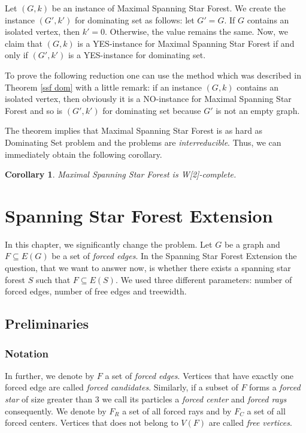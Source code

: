 \documentclass[en]{pracamgr}
\newtheorem{corollary}{Corollary}
\newenvironment{sproof}{%
	\renewcommand{\proofname}{Proof (sketch).}\proof}{\endproof}
\newcommand{\ssf}{spanning star forest}
\newcommand{\mssfp}{{\sc Maximal Spanning Star Forest}}
\newcommand{\ssfep}{{\sc Spanning Star Forest Extension}}
\newcommand{\domset}{dominating set}
\newcommand{\domsetp}{{\sc Dominating Set} problem}
\begin{document}
\begin{sproof}
	Let $(G,k)$ be an instance of \mssfp{}. We create the instance $(G',k')$ for \domset{} as follows: let $G'=G$. If $G$ contains an isolated vertex, then $k'=0$. Otherwise, the value remains the same. Now, we claim that $(G,k)$ is a YES-instance for \mssfp{} if and only if $(G',k')$ is a YES-instance for \domset.
	
	To prove the following reduction one can use the method which was described in Theorem \ref{ssf dom} with a little remark: if an instance $(G,k)$ contains an isolated vertex, then obviously it is a NO-instance for \mssfp{} and so is $(G',k')$ for \domset{} because $G'$ is not an empty graph.
\end{sproof}

The theorem implies that \mssfp{} is as hard as \domsetp{} and the problems are \emph{interreducible}. Thus, we can immediately obtain the following corollary.

\begin{corollary}
	\mssfp{} is {\normalfont W[2]-complete}.
\end{corollary}

\chapter{Spanning Star Forest Extension}

In this chapter, we significantly change the problem. Let $G$ be a graph and $F \subseteq E(G)$ be a set of \emph{forced edges}. In the \ssfep{} the question, that we want to answer now, is whether there exists a \ssf{} $S$ such that $F \subseteq E(S)$. We used three different parameters: number of forced edges, number of free edges and treewidth. 

\section{Preliminaries}

\subsection{Notation}

In further, we denote by $F$ a set of \emph{forced edges}. Vertices that have exactly one forced edge are called \emph{forced candidates}. Similarly, if a subset of $F$ forms a \emph{forced star} of size greater than $3$ we call its particles a \emph{forced center} and \emph{forced rays} consequently. We denote by $F_R$ a set of all forced rays and by $F_C$ a set of all forced centers. Vertices that does not belong to $V(F)$ are called \emph{free vertices}.
\end{document}
